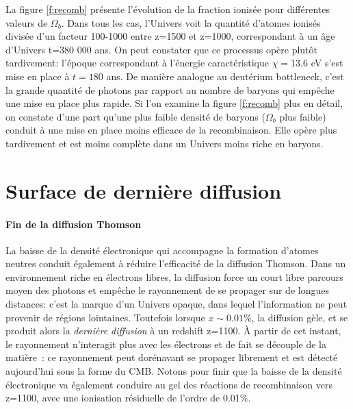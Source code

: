 La figure \ref{f:recomb} présente l'évolution de la fraction ionisée pour différentes valeurs de $\Omega_b$. Dans tous les cas, l'Univers voit la quantité d'atomes ionisés divisée d'un facteur 100-1000 entre z=1500 et z=1000, correspondant à un âge d'Univers t=380 000 ans. On peut constater que ce processus opère plutôt tardivement: l'époque correspondant à l'énergie caractéristique $\chi=$13.6 eV s'est mise en place à $t=180$ ans. De manière analogue au deutérium bottleneck, c'est la grande quantité de photons par rapport au nombre de baryons  qui empêche une mise en place plus rapide. Si l'on examine la figure \ref{f:recomb} plus en détail, on constate d'une part qu'une plus faible densité de baryons ($\Omega_b$ plus faible) conduit à une mise en place moins efficace de la recombinaison. Elle opère plus tardivement et est moins complète dans un Univers moins riche en baryons.

\section{Surface de dernière diffusion}

\paragraph{Fin de la diffusion Thomson} La baisse de la densité électronique qui accompagne la formation d'atomes neutres conduit également à réduire l'efficacité de la diffusion Thomson. Dans un environnement riche en électrons libres, la diffusion force un court libre parcours moyen des photons et empêche le rayonnement de se propager sur de longues distances: c'est la marque d'un Univers opaque, dans lequel l'information ne peut provenir de régions lointaines.  Toutefois lorsque $x\sim 0.01\%$, la diffusion gèle, et se produit alors la \textit{dernière diffusion} à un redshift z=1100. À partir de cet instant, le rayonnement n'interagit plus avec les électrons et de fait se découple de la matière~: ce rayonnement peut dorénavant se propager librement et est détecté aujourd'hui sous la forme du CMB. Notons pour finir que la baisse de la densité électronique va également conduire au gel des réactions de recombinaison vers z=1100, avec une ionisation résiduelle de l'ordre de 0.01\%.



